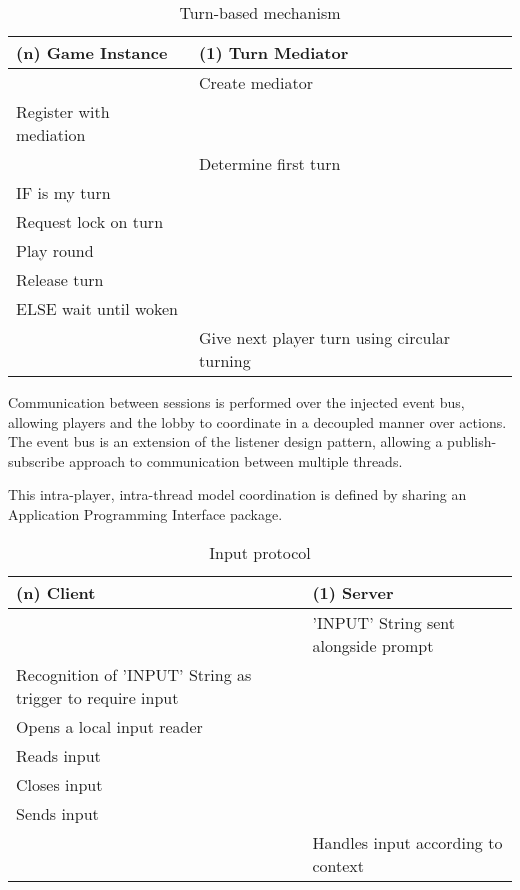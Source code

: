 \begin{table}[H]
	\centering
	\begin{tabular}{ | l | l | }
		\hline
		(n) Game Instance & (1) Turn Mediator \\
		\hline
		\hline
		 &  Create mediator \\
		\hline
		Register with mediation &  \\
		\hline
		& Determine first turn \\
		\hline 
		IF is my turn & \\
		\hline
		Request lock on turn & \\
		\hline
		Play round & \\
		\hline
		Release turn &  \\
		\hline
		ELSE wait until woken & \\ 
		\hline
		& Give next player turn using circular turning  \\
		\hline
	\end{tabular}
	\caption{Turn-based mechanism}
	\label{tab:turnBasedMechanism}
\end{table}

Communication between sessions is performed over the injected event bus, allowing players and the lobby to coordinate in a decoupled manner over actions. The event bus is an extension of the listener design pattern, allowing a publish-subscribe approach to communication between multiple threads. 

This intra-player, intra-thread model coordination is defined by sharing an Application Programming Interface package. 

\begin{table}[H]
	\centering
	\begin{tabular}{ | l | l | }
		\hline
		(n) Client & (1) Server  \\
		\hline
		\hline
		&  'INPUT' String sent alongside prompt  \\
		\hline
		Recognition of 'INPUT' String as trigger to require input & \\
		\hline
		Opens a local input reader &  \\
		\hline
		Reads input &  \\
		\hline
		Closes input & \\
		\hline
		Sends input & \\
		\hline
		 &  Handles input  according to context \\
		\hline
	\end{tabular}
	\caption{Input protocol}
	\label{tab:inputProtocol}
\end{table}

